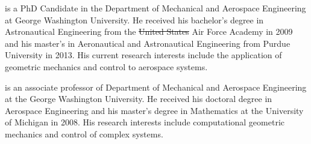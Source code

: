 \documentclass[10pt,fleqn]{IJCAS}  %
\providecommand{\DIFadd}[1]{{\protect\color{blue}\uwave{#1}}} %
\providecommand{\DIFdel}[1]{{\protect\color{red}\sout{#1}}}                      %
\providecommand{\DIFaddbegin}{} %
\providecommand{\DIFaddend}{} %
\providecommand{\DIFdelbegin}{} %
\providecommand{\DIFdelend}{} %
\begin{document}
\begin{multicols}{2}
\DIFaddend %
%	

                                  \DIFdelbegin %

\DIFdelend 

\DIFdelbegin %

\DIFdelend {}
    {is a PhD Candidate in the Department of Mechanical and Aerospace Engineering at George Washington University. 
    He received his bachelor's degree in Astronautical Engineering from the \DIFdelbegin \DIFdel{United States }\DIFdelend \DIFaddbegin \DIFadd{US }\DIFaddend Air Force Academy in 2009 and his master's \DIFaddbegin \DIFadd{degree }\DIFaddend in Aeronautical and Astronautical Engineering from Purdue University in 2013.
    His current research interests include the application of geometric mechanics and control to aerospace systems. 
    }
\DIFdelbegin %

\DIFdelend {}
    {is an associate professor of Department of Mechanical and Aerospace Engineering at the George Washington University. 
    He received his doctoral degree in Aerospace Engineering and his master's degree in Mathematics at the University of Michigan in 2008. 
    His research interests include computational geometric mechanics and control of complex systems.}    
\clearafterbiography\relax
\clearafterbiography\relax
\DIFaddbegin 

\DIFaddend \end{multicols}
\end{document}
